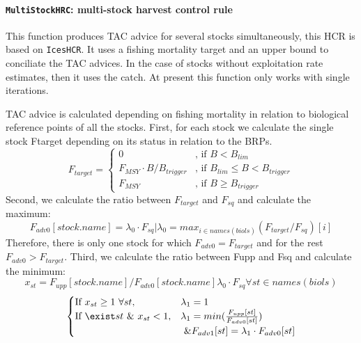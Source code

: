   \paragraph{\texttt{MultiStockHRC}: multi-stock harvest control rule} \hspace{0pt} \smallskip

  This function produces TAC advice for several stocks simultaneously, this HCR is based on \texttt{IcesHCR}. 
  It uses a fishing mortality target and an upper bound to conciliate the TAC advices. In the case of stocks without exploitation rate estimates, then it uses the catch. At present this function only works with single iterations.
  
  
  TAC advice is calculated depending on fishing mortality in relation to biological reference points of all the stocks.
  First, for each stock we calculate the single stock  Ftarget depending on its status in relation to the BRPs.
    \begin{equation}
    	F_{target} =
    	\begin{cases}
  				0                              & \text{, if } B < B_{lim} \\
  				F_{MSY} \cdot  B / B_{trigger} & \text{, if } B_{lim} \leq B < B_{trigger} \\
  				F_{MSY}                        & \text{, if } B \geq B_{trigger}
    	\end{cases}
    \end{equation}
  Second, we calculate the ratio between $F_{target}$ and $F_{sq}$ and calculate the maximum:
    \begin{equation}
    	F_{adv0}[stock.name] = \lambda_0 \cdot F_{sq} | \lambda_0 = max_{i \in names(biols)}(F_{target}/F_{sq})[i]
    \end{equation}
  Therefore, there is only one stock for which $F_{adv0} = F_{target}$ and for the rest $F_{adv0} > F_{target}$.
  Third, we calculate the ratio between Fupp and Fsq and calculate the minimum:
    \begin{equation}
    	x_{st} = F_{upp}[stock.name] /  F_{adv0}[stock.name]\lambda_0 \cdot F_{sq} \forall st \in names(biols)
    \end{equation}
    \begin{equation}
       \begin{cases}
  			  \text{If } x_{st} \geq 1  \text{ } \forall st,
  			          & \lambda_1 = 1 \\
  			  \text{If } \exist st \text{ } \& \text{ }  x_{st} < 1,
  			          & \lambda_1 = min(\frac{F_{upp}[st]}{F_{adv0}[st]}) \\
  			          & \text{ } \& F_{adv1}[st] = \lambda_1 \cdot F_{adv0}[st]
    	\end{cases}
    \end{equation}
